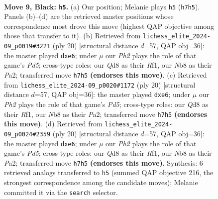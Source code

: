 \documentclass[11pt]{article}
\begin{document}
\clearpage

\begin{figure}[p]\centering
\begin{subfigure}{0.46\textwidth}\centering
\resizebox{\linewidth}{!}{%
\newchessgame
\chessboard[
  setfen={rnbqkb1r/ppp1pp1p/1n4p1/3pP1N1/P2P4/1B6/1PP2PPP/RNBQ1RK1 b kq - 0 9},
  showmover=false,
  pgfstyle=straightmove, color=movearrow, markmove={h7-h5}
]}
\caption{}
\end{subfigure}\hfill
\begin{subfigure}{0.46\textwidth}\centering
\resizebox{\linewidth}{!}{%
\newchessgame
\chessboard[
  setfen={r1bq1rk1/ppp1b1pp/3pp3/n2P1p2/2P5/2P2NP1/P1Q1PPBP/R1B2RK1 w - - 1 11},
  showmover=false,
  pgfstyle=straightmove, color=movearrow, markmove={d5-e6}
]}
\caption{}
\end{subfigure}
\\[4pt]
\begin{subfigure}{0.46\textwidth}\centering
\resizebox{\linewidth}{!}{%
\newchessgame
\chessboard[
  setfen={r1bq1rk1/ppp1b1pp/3pp3/n2P1p2/2P5/2P2NP1/P1Q1PPBP/R1B2RK1 w - - 1 11},
  showmover=false,
  pgfstyle=straightmove, color=movearrow, markmove={d5-e6}
]}
\caption{}
\end{subfigure}\hfill
\begin{subfigure}{0.46\textwidth}\centering
\resizebox{\linewidth}{!}{%
\newchessgame
\chessboard[
  setfen={r1bq1rk1/ppp1b1pp/3pp3/n2P1p2/2P5/2P2NP1/P1Q1PPBP/R1B2RK1 w - - 1 11},
  showmover=false,
  pgfstyle=straightmove, color=movearrow, markmove={d5-e6}
]}
\caption{}
\end{subfigure}
\caption{\textbf{Move 9, Black: \texttt{h5}.} (a) Our position; Melanie plays \texttt{h5} (\texttt{h7h5}). Panels (b)--(d) are the retrieved master positions whose correspondence most drove this move (highest QAP objective among those that transfer to it). (b) Retrieved from \texttt{lichess\_elite\_2024-09\_p0019\#3221} (ply 20) [structural distance $d$=57, QAP obj=36]: the master played \texttt{dxe6}; under $\mu$ our \emph{Ph2} plays the role of that game's \emph{Pd5}; cross-type roles: our \emph{Q}d8 as their \emph{R}f1, our \emph{N}b8 as their \emph{P}a2; transferred move \texttt{h7h5} \textbf{(endorses this move)}. (c) Retrieved from \texttt{lichess\_elite\_2024-09\_p0020\#1172} (ply 20) [structural distance $d$=57, QAP obj=36]: the master played \texttt{dxe6}; under $\mu$ our \emph{Ph2} plays the role of that game's \emph{Pd5}; cross-type roles: our \emph{Q}d8 as their \emph{R}f1, our \emph{N}b8 as their \emph{P}a2; transferred move \texttt{h7h5} \textbf{(endorses this move)}. (d) Retrieved from \texttt{lichess\_elite\_2024-09\_p0024\#2359} (ply 20) [structural distance $d$=57, QAP obj=36]: the master played \texttt{dxe6}; under $\mu$ our \emph{Ph2} plays the role of that game's \emph{Pd5}; cross-type roles: our \emph{Q}d8 as their \emph{R}f1, our \emph{N}b8 as their \emph{P}a2; transferred move \texttt{h7h5} \textbf{(endorses this move)}. Synthesis: 6 retrieved analogs transferred to \texttt{h5} (summed QAP objective 216, the strongest correspondence among the candidate moves); Melanie committed it via the \texttt{search} selector.}
\label{fig:thought-m17}
\end{figure}
\end{document}
